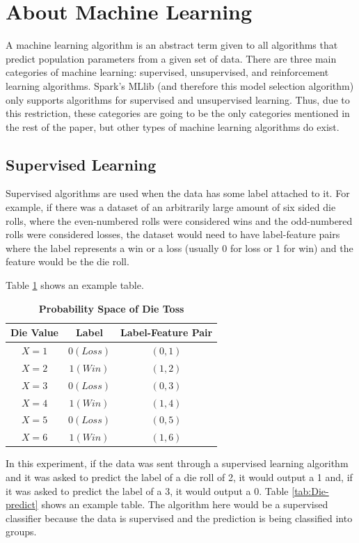 \documentclass[9pt,twocolumn,twoside]{idsi}
\begin{document}
\section{About Machine Learning}
A machine learning algorithm is an abstract term given to all algorithms that predict population parameters from a given set of data. There are three main categories of machine learning: supervised, unsupervised, and reinforcement learning algorithms. Spark's MLlib \cite{spark_mllib} (and therefore this model selection algorithm) only supports algorithms for supervised and unsupervised learning. Thus, due to this restriction, these categories are going to be the only categories mentioned in the rest of the paper, but other types of machine learning algorithms do exist. 

\subsection{Supervised Learning}
Supervised algorithms are used when the data has some label attached to it. For example, if there was a dataset of an arbitrarily large amount of six sided die rolls, where the even-numbered rolls were considered wins and the odd-numbered rolls were considered losses, the dataset would need to have label-feature pairs where the label represents a win or a loss (usually 0 for loss or 1 for win) and the feature would be the die roll.

 Table \ref{tab:Die-tosses} shows an example table. 
\begin{table}[htbp]
\centering
\caption{\bf Probability Space of Die Toss}
\begin{tabular}{ccc}
\hline
Die Value & Label & Label-Feature Pair \\
\hline
$X = 1$ & $0(Loss)$ & $(0,1)$ \\
$X = 2$ & $1(Win)$ & $(1,2)$ \\
$X = 3$ & $0(Loss)$ & $(0,3)$ \\
$X = 4$ & $1(Win)$ & $(1,4)$ \\
$X = 5$ & $0(Loss)$ & $(0,5)$ \\
$X = 6$ & $1(Win)$ & $(1,6)$ \\
\hline
\end{tabular}
  \label{tab:Die-tosses}
\end{table}

In this experiment, if the data was sent through a supervised learning algorithm and it was asked to predict the label of a die roll of 2, it would output a 1 and, if it was asked to predict the label of a 3, it would output a 0. Table \ref{tab:Die-predict} shows an example table. The algorithm here would be a supervised classifier because the data is supervised and the prediction is being classified into groups. 
\end{document}
